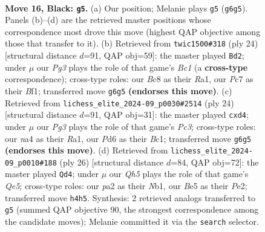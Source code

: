\documentclass[11pt]{article}
\begin{document}
\clearpage

\begin{figure}[p]\centering
\begin{subfigure}{0.46\textwidth}\centering
\resizebox{\linewidth}{!}{%
\newchessgame
\chessboard[
  setfen={r1br2k1/ppp2p1p/3p2p1/4b3/N1P1Pn1q/4Q2P/PP2BPP1/R1B2R1K b - - 12 16},
  showmover=false,
  pgfstyle=straightmove, color=movearrow, markmove={g6-g5}
]}
\caption{}
\end{subfigure}\hfill
\begin{subfigure}{0.46\textwidth}\centering
\resizebox{\linewidth}{!}{%
\newchessgame
\chessboard[
  setfen={r1b1r1k1/ppp1bp1p/2n2p2/3qp2Q/8/P2PPN2/1P3PPP/R1B1KB1R w KQ - 1 13},
  showmover=false,
  pgfstyle=straightmove, color=movearrow, markmove={c1-d2}
]}
\caption{}
\end{subfigure}
\\[4pt]
\begin{subfigure}{0.46\textwidth}\centering
\resizebox{\linewidth}{!}{%
\newchessgame
\chessboard[
  setfen={r1b1kr2/pp2bpQp/2nqp3/8/3p4/P1PB1N2/2P2PPP/R1B2RK1 w q - 0 13},
  showmover=false,
  pgfstyle=straightmove, color=movearrow, markmove={c3-d4}
]}
\caption{}
\end{subfigure}\hfill
\begin{subfigure}{0.46\textwidth}\centering
\resizebox{\linewidth}{!}{%
\newchessgame
\chessboard[
  setfen={1k1r1b1r/p1pqn1pp/1p2p3/3pQb2/PP6/2P1B1PP/4PPB1/RN2K2R w KQ - 1 14},
  showmover=false,
  pgfstyle=straightmove, color=movearrow, markmove={e5-d4}
]}
\caption{}
\end{subfigure}
\caption{\textbf{Move 16, Black: \texttt{g5}.} (a) Our position; Melanie plays \texttt{g5} (\texttt{g6g5}). Panels (b)--(d) are the retrieved master positions whose correspondence most drove this move (highest QAP objective among those that transfer to it). (b) Retrieved from \texttt{twic1500\#318} (ply 24) [structural distance $d$=91, QAP obj=59]: the master played \texttt{Bd2}; under $\mu$ our \emph{Pg3} plays the role of that game's \emph{Bc1} (a \textbf{cross-type} correspondence); cross-type roles: our \emph{B}c8 as their \emph{R}a1, our \emph{P}c7 as their \emph{B}f1; transferred move \texttt{g6g5} \textbf{(endorses this move)}. (c) Retrieved from \texttt{lichess\_elite\_2024-09\_p0030\#2514} (ply 24) [structural distance $d$=91, QAP obj=31]: the master played \texttt{cxd4}; under $\mu$ our \emph{Pg3} plays the role of that game's \emph{Pc3}; cross-type roles: our \emph{n}a4 as their \emph{R}a1, our \emph{P}d6 as their \emph{B}c1; transferred move \texttt{g6g5} \textbf{(endorses this move)}. (d) Retrieved from \texttt{lichess\_elite\_2024-09\_p0010\#188} (ply 26) [structural distance $d$=84, QAP obj=72]: the master played \texttt{Qd4}; under $\mu$ our \emph{Qh5} plays the role of that game's \emph{Qe5}; cross-type roles: our \emph{p}a2 as their \emph{N}b1, our \emph{B}e5 as their \emph{P}e2; transferred move \texttt{h4h5}. Synthesis: 2 retrieved analogs transferred to \texttt{g5} (summed QAP objective 90, the strongest correspondence among the candidate moves); Melanie committed it via the \texttt{search} selector.}
\label{fig:thought-m31}
\end{figure}
\end{document}
